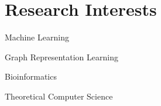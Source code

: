 
\section{Research Interests} 
\begin{multicols}{2}
    \begin{compactitem}
        \item Machine Learning
        \item Graph Representation Learning 
        \item Bioinformatics 
        \item Theoretical Computer Science 
    \end{compactitem}
\end{multicols}
